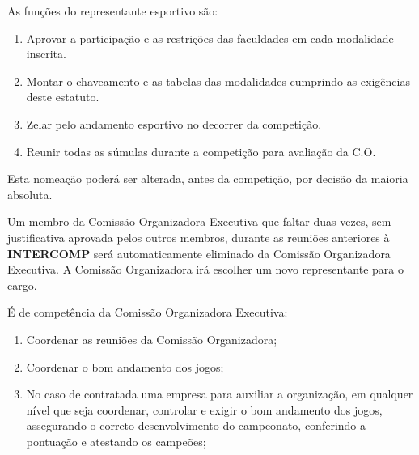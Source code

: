 \begin{article}
	\begin{xparagraph}
		As funções do representante esportivo são:
		\begin{enumerate}[noitemsep]
			\item Aprovar a participação e as restrições das faculdades em cada modalidade inscrita.
			\item Montar o chaveamento e as tabelas das modalidades cumprindo as exigências deste estatuto.
			\item Zelar pelo andamento esportivo no decorrer da competição.
			\item Reunir todas as súmulas durante a competição para avaliação da C.O.
		\end{enumerate}
	\end{xparagraph}

	\begin{xparagraph}
		Esta nomeação poderá ser alterada, antes da competição, por decisão da maioria absoluta.
	\end{xparagraph}

	\begin{xparagraph}
		Um membro da Comissão Organizadora Executiva que faltar duas vezes, sem justificativa aprovada pelos outros membros, durante as reuniões anteriores à \textbf{INTERCOMP} será automaticamente eliminado da Comissão Organizadora Executiva. A Comissão Organizadora irá escolher um novo representante para o cargo.
	\end{xparagraph}

	\begin{xparagraph}
		É de competência da Comissão Organizadora Executiva:
		\begin{enumerate}[noitemsep]
			\item Coordenar as reuniões da Comissão Organizadora;
			\item Coordenar o bom andamento dos jogos;
			\item No caso de contratada uma empresa para auxiliar a organização, em qualquer nível que seja coordenar, controlar e exigir o bom andamento dos jogos, assegurando o correto desenvolvimento do campeonato, conferindo a pontuação e atestando os campeões;
		\end{enumerate}
	\end{xparagraph}
\end{article}

